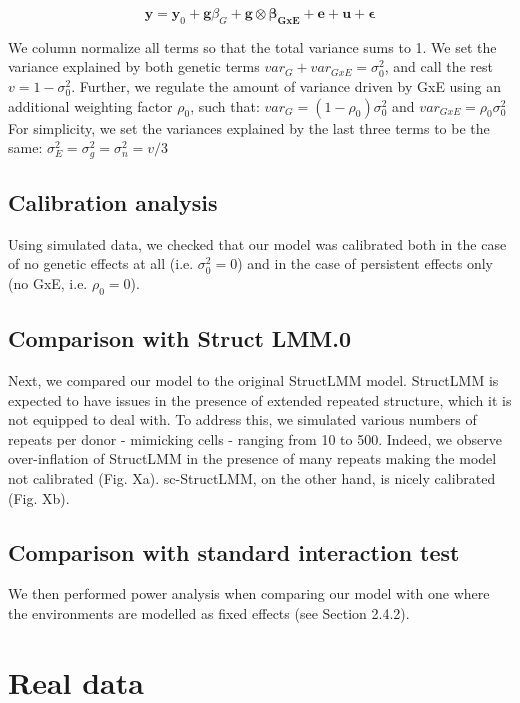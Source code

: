 \begin{equation}
 \mathbf{y} = \mathbf{y}_0 + \mathbf{g}\beta_G + \mathbf{g} \otimes \boldsymbol{\beta_{GxE}} + \mathbf{e} + \mathbf{u} + \boldsymbol{\epsilon} 
\end{equation}

We column normalize all terms so that the total variance sums to 1.
We set the variance explained by both genetic terms $var_G+var_{GxE}=\sigma_0^2$, and call the rest $v = 1-\sigma_0^2$.
Further, we regulate the amount of variance driven by GxE using an additional weighting factor $\rho_0$, such that: $var_G = (1-\rho_0)\sigma_0^2$ and $var_{GxE} = \rho_0\sigma_0^2$
For simplicity, we set the variances explained by the last three terms to be the same:
$\sigma_E^2 = \sigma_g^2 = \sigma_n^2 = v/3$

\subsection{Calibration analysis}

Using simulated data, we checked that our model was calibrated both in the case of no genetic effects at all (i.e. $\sigma_0^2 = 0$) and in the case of persistent effects only (no GxE, i.e. $\rho_0 = 0$).

\subsection{Comparison with Struct LMM.0}

Next, we compared our model to the original StructLMM model.
StructLMM is expected to have issues in the presence of extended repeated structure, which it is not equipped to deal with.
To address this, we simulated various numbers of repeats per donor - mimicking cells -  ranging from 10 to 500.
Indeed, we observe over-inflation of StructLMM in the presence of many repeats making the model not calibrated (Fig. Xa).
sc-StructLMM, on the other hand, is nicely calibrated (Fig. Xb).

\subsection{Comparison with standard interaction test}

We then performed power analysis when comparing our model with one where the environments are modelled as fixed effects (see Section 2.4.2).

\newpage

\section{Real data}

